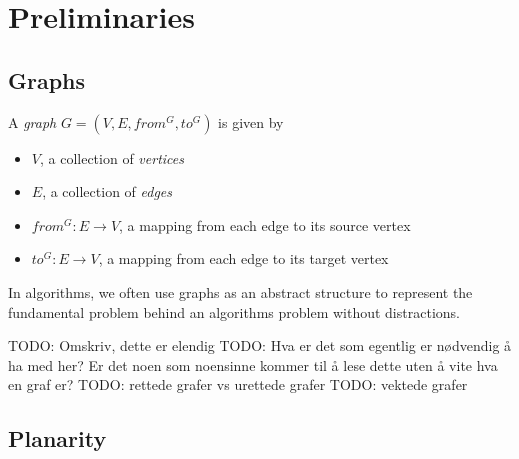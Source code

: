\chapter{Preliminaries}

\section{Graphs}

A \emph{graph} $G = (V, E, from^G, to^G)$ is given by
\begin{itemize}
    \item $V$, a collection of \emph{vertices}
    \item $E$, a collection of \emph{edges}
    \item $from^G : E \rightarrow V$, a mapping from each edge to its source vertex
    \item $to^G : E \rightarrow V$, a mapping from each edge to its target vertex 
\end{itemize}

In algorithms, we often use graphs as an abstract structure to represent the fundamental problem behind an algorithms problem without distractions.

TODO: Omskriv, dette er elendig
TODO: Hva er det som egentlig er nødvendig å ha med her? Er det noen som noensinne kommer til å lese dette uten å vite hva en graf er?
TODO: rettede grafer vs urettede grafer
TODO: vektede grafer

\section{Planarity}
